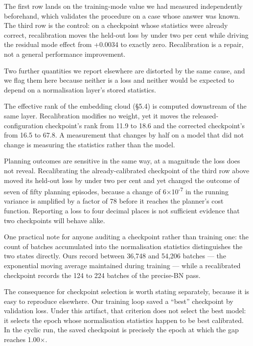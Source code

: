 \documentclass[10pt]{article}
\begin{document}
The first row lands on the training-mode value we had measured independently
beforehand, which validates the procedure on a case whose answer was known. The
third row is the control: on a checkpoint whose statistics were already
correct, recalibration moves the held-out loss by under two per cent while
driving the residual mode effect from +0.0034 to exactly zero. Recalibration
is a repair, not a general performance improvement.

Two further quantities we report elsewhere are distorted by the same cause, and
we flag them here because neither is a loss and neither would be expected to
depend on a normalisation layer's stored statistics.

The effective rank of the embedding cloud (\S{}5.4) is computed downstream of the
same layer. Recalibration modifies no weight, yet it moves the
released-configuration checkpoint's rank from 11.9 to 18.6 and the corrected
checkpoint's from 16.5 to 67.8. A measurement that changes by half on a model
that did not change is measuring the statistics rather than the model.

Planning outcomes are sensitive in the same way, at a magnitude the loss does
not reveal. Recalibrating the already-calibrated checkpoint of the third row
above moved its held-out loss by under two per cent and yet changed the outcome
of seven of fifty planning episodes, because a change of 6$\times$10\textsuperscript{-7} in the running
variance is amplified by a factor of 78 before it reaches the planner's cost
function. Reporting a loss to four decimal places is not sufficient evidence
that two checkpoints will behave alike.

One practical note for anyone auditing a checkpoint rather than training one:
the count of batches accumulated into the normalisation statistics distinguishes
the two states directly. Ours record between 36,748 and 54,206 batches --- the
exponential moving average maintained during training --- while a recalibrated
checkpoint records the 124 to 224 batches of the precise-BN pass.

The consequence for checkpoint selection is worth stating separately, because it
is easy to reproduce elsewhere. Our training loop saved a ``best'' checkpoint by
validation loss. Under this artifact, that criterion does not select the best
model: it selects the epoch whose normalisation statistics happen to be best
calibrated. In the cyclic run, the saved checkpoint is precisely the epoch at
which the gap reaches 1.00$\times$.
\end{document}
